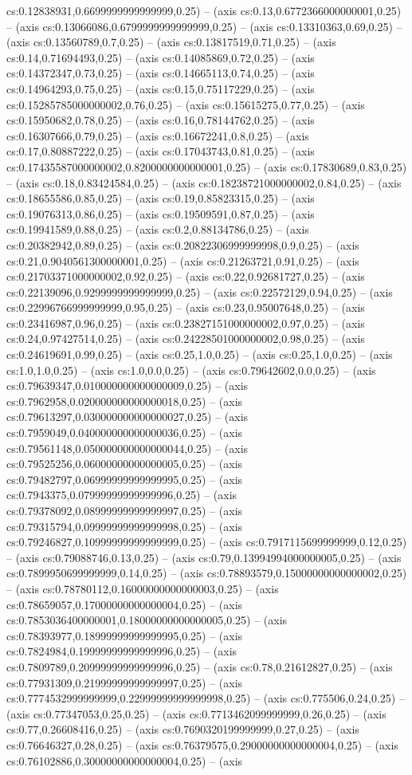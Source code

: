 cs:0.12838931,0.6699999999999999,0.25) -- (axis cs:0.13,0.6772366000000001,0.25) -- (axis cs:0.13066086,0.6799999999999999,0.25) -- (axis cs:0.13310363,0.69,0.25) -- (axis cs:0.13560789,0.7,0.25) -- (axis cs:0.13817519,0.71,0.25) -- (axis cs:0.14,0.71694493,0.25) -- (axis cs:0.14085869,0.72,0.25) -- (axis cs:0.14372347,0.73,0.25) -- (axis cs:0.14665113,0.74,0.25) -- (axis cs:0.14964293,0.75,0.25) -- (axis cs:0.15,0.75117229,0.25) -- (axis cs:0.15285785000000002,0.76,0.25) -- (axis cs:0.15615275,0.77,0.25) -- (axis cs:0.15950682,0.78,0.25) -- (axis cs:0.16,0.78144762,0.25) -- (axis cs:0.16307666,0.79,0.25) -- (axis cs:0.16672241,0.8,0.25) -- (axis cs:0.17,0.80887222,0.25) -- (axis cs:0.17043743,0.81,0.25) -- (axis cs:0.17435587000000002,0.8200000000000001,0.25) -- (axis cs:0.17830689,0.83,0.25) -- (axis cs:0.18,0.83424584,0.25) -- (axis cs:0.18238721000000002,0.84,0.25) -- (axis cs:0.18655586,0.85,0.25) -- (axis cs:0.19,0.85823315,0.25) -- (axis cs:0.19076313,0.86,0.25) -- (axis cs:0.19509591,0.87,0.25) -- (axis cs:0.19941589,0.88,0.25) -- (axis cs:0.2,0.88134786,0.25) -- (axis cs:0.20382942,0.89,0.25) -- (axis cs:0.20822306999999998,0.9,0.25) -- (axis cs:0.21,0.9040561300000001,0.25) -- (axis cs:0.21263721,0.91,0.25) -- (axis cs:0.21703371000000002,0.92,0.25) -- (axis cs:0.22,0.92681727,0.25) -- (axis cs:0.22139096,0.9299999999999999,0.25) -- (axis cs:0.22572129,0.94,0.25) -- (axis cs:0.22996766999999999,0.95,0.25) -- (axis cs:0.23,0.95007648,0.25) -- (axis cs:0.23416987,0.96,0.25) -- (axis cs:0.23827151000000002,0.97,0.25) -- (axis cs:0.24,0.97427514,0.25) -- (axis cs:0.24228501000000002,0.98,0.25) -- (axis cs:0.24619691,0.99,0.25) -- (axis cs:0.25,1.0,0.25) -- (axis cs:0.25,1.0,0.25) -- (axis cs:1.0,1.0,0.25) -- (axis cs:1.0,0.0,0.25) -- (axis cs:0.79642602,0.0,0.25) -- (axis cs:0.79639347,0.010000000000000009,0.25) -- (axis cs:0.7962958,0.020000000000000018,0.25) -- (axis cs:0.79613297,0.030000000000000027,0.25) -- (axis cs:0.7959049,0.040000000000000036,0.25) -- (axis cs:0.79561148,0.050000000000000044,0.25) -- (axis cs:0.79525256,0.06000000000000005,0.25) -- (axis cs:0.79482797,0.06999999999999995,0.25) -- (axis cs:0.7943375,0.07999999999999996,0.25) -- (axis cs:0.79378092,0.08999999999999997,0.25) -- (axis cs:0.79315794,0.09999999999999998,0.25) -- (axis cs:0.79246827,0.10999999999999999,0.25) -- (axis cs:0.7917115699999999,0.12,0.25) -- (axis cs:0.79088746,0.13,0.25) -- (axis cs:0.79,0.13994994000000005,0.25) -- (axis cs:0.7899950699999999,0.14,0.25) -- (axis cs:0.78893579,0.15000000000000002,0.25) -- (axis cs:0.78780112,0.16000000000000003,0.25) -- (axis cs:0.78659057,0.17000000000000004,0.25) -- (axis cs:0.7853036400000001,0.18000000000000005,0.25) -- (axis cs:0.78393977,0.18999999999999995,0.25) -- (axis cs:0.7824984,0.19999999999999996,0.25) -- (axis cs:0.7809789,0.20999999999999996,0.25) -- (axis cs:0.78,0.21612827,0.25) -- (axis cs:0.77931309,0.21999999999999997,0.25) -- (axis cs:0.7774532999999999,0.22999999999999998,0.25) -- (axis cs:0.775506,0.24,0.25) -- (axis cs:0.77347053,0.25,0.25) -- (axis cs:0.7713462099999999,0.26,0.25) -- (axis cs:0.77,0.26608416,0.25) -- (axis cs:0.7690320199999999,0.27,0.25) -- (axis cs:0.76646327,0.28,0.25) -- (axis cs:0.76379575,0.29000000000000004,0.25) -- (axis cs:0.76102886,0.30000000000000004,0.25) -- (axis 